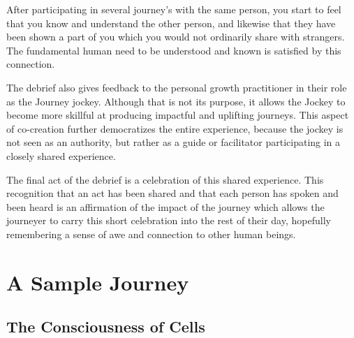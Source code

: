 \documentclass[12pt]{book}
\begin{document}
After participating in several journey’s with the same person, you
start to feel that you know and understand the other person, and
likewise that they have been shown a part of you which you would not
ordinarily share with strangers. The fundamental human need to be
understood and known is satisfied by this connection.
					
The debrief also gives feedback to the personal growth practitioner in their
role as the Journey jockey. Although that
is not its purpose, it allows the Jockey to become more skillful at
producing impactful and uplifting journeys. This aspect of co-creation
further democratizes the entire experience, because the jockey is not
seen as an authority, but rather as a guide or facilitator
participating in a closely shared experience.
				
					
The final act of the debrief is a celebration of this shared
experience. This recognition that an act has been shared and that each
person has spoken and been heard is an affirmation of the impact of
the journey which allows the journeyer to carry this short celebration
into the rest of their day, hopefully remembering a sense of awe and
connection to other human beings.


\chapter{A Sample Journey}


\section{The Consciousness of Cells}
\end{document}

